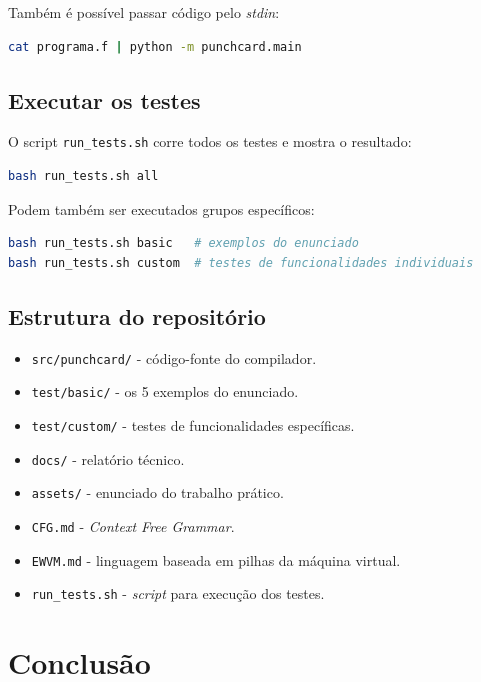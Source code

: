 \documentclass[11pt, a4paper, fleqn]{article}
\begin{document}
\noindent Também é possível passar código pelo \textit{stdin}:

\begin{lstlisting}[language=bash]
cat programa.f | python -m punchcard.main
\end{lstlisting}

\subsection{Executar os testes}

O script \texttt{run\_tests.sh} corre todos os testes e mostra o resultado:

\begin{lstlisting}[language=bash]
bash run_tests.sh all
\end{lstlisting}

\noindent Podem também ser executados grupos específicos:

\begin{lstlisting}[language=bash]
bash run_tests.sh basic   # exemplos do enunciado
bash run_tests.sh custom  # testes de funcionalidades individuais
\end{lstlisting}

\subsection{Estrutura do repositório}

\begin{itemize}
    \item \texttt{src/punchcard/} - código-fonte do compilador.
    \item \texttt{test/basic/} - os 5 exemplos do enunciado.
    \item \texttt{test/custom/} - testes de funcionalidades específicas.
    \item \texttt{docs/} - relatório técnico.
    \item \texttt{assets/} - enunciado do trabalho prático.
    \item \texttt{CFG.md} - \textit{Context Free Grammar}.
    \item \texttt{EWVM.md} - linguagem baseada em pilhas da máquina virtual.
    \item \texttt{run\_tests.sh} - \textit{script} para execução dos testes.
\end{itemize}

\section{Conclusão}
\end{document}
